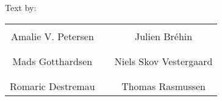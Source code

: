 Text by:\\
\vspace{-7 pt}
\begin{table}[H]
	\centering
		\begin{tabular}{c c c}
			\underline{\phantom{JAERJAERJAERJAERGO}} & \phantom{cookies} & \underline{\phantom{JAERJAERJAERJAERGO}} \\
			Amalie V. Petersen			& \phantom{cookies} & Julien Br\'ehin		\\
			&&\\
			\underline{\phantom{JAERJAERJAERJAERGO}} & \phantom{cookies} & \underline{\phantom{JAERJAERJAERJAERGO}} \\
			Mads Gotthardsen			& \phantom{cookies} & Niels Skov Vestergaard		\\
			&&\\
	    	\underline{\phantom{JAERJAERJAERJAERGO}} & \phantom{cookies} & \underline{\phantom{JAERJAERJAERJAERGO}} \\
			Romaric Destremau 					& \phantom{cookies} & Thomas Rasmussen 			\\			
		\end{tabular}
\end{table}